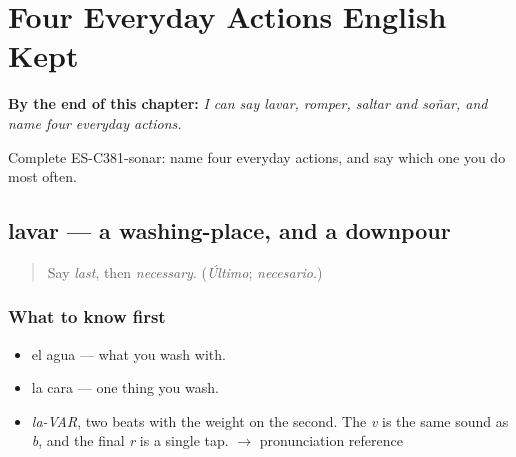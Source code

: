
\chapter{Four Everyday Actions English Kept}
\label{ch:lavar-y-romper}

\begin{chapteropening}
\textbf{By the end of this chapter:} \emph{I can say lavar, romper, saltar and soñar, and name four everyday actions.}

Complete ES-C381-sonar: name four everyday actions, and say which one you do most often.
\end{chapteropening}

\section[lavar]{lavar — a washing-place, and a downpour}

\label{lesson:ES-C381-lavar}



\begin{quote}
Say \emph{last}, then \emph{necessary}. (\emph{Último}; \emph{necesario}.)
\end{quote}

\subsection*{What to know first}
\begin{itemize}
\raggedright
  \item el agua — what you wash with.
  \item la cara — one thing you wash.
\end{itemize}

\begin{sounds}
\begin{itemize}
\raggedright
  \item \emph{la-VAR}, two beats with the weight on the second. The \emph{v} is the same sound as \emph{b}, and the final \emph{r} is a single tap. $\to$ pronunciation reference
\end{itemize}
\end{sounds}


